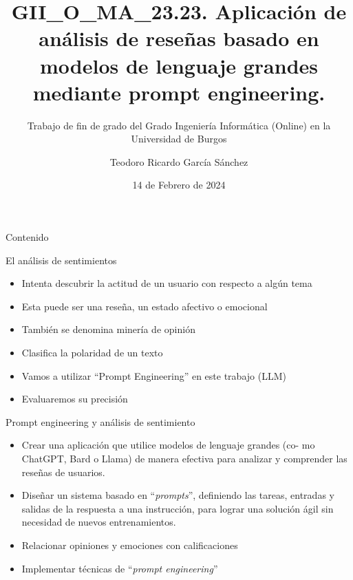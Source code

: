 \documentclass[aspectratio=169,xcolor=dvipsnames, t]{beamer}
\title[Prompt sentiment]{GII\_O\_MA\_23.23. Aplicación de análisis de reseñas basado en modelos de lenguaje grandes mediante prompt engineering.} %
\subtitle{Trabajo de fin de grado del Grado Ingeniería Informática (Online) en la Universidad de Burgos}
\author[García Sánchez]{Teodoro Ricardo García Sánchez}
\institute[Grado de Ingeniería Informática (Online)]{Dra. Virginia Ahedo García\\Dr. José Ignacio Santos Martín}
\date{14 de Febrero de 2024} %
\begin{document}
\maketitlepage

\begin{frame}[t]{Contenido}
    \tableofcontents
\end{frame}


\begin{frame}{El análisis de sentimientos}
    \begin{itemize}
        \item Intenta descubrir la actitud de un usuario con respecto a algún tema
        \item Esta puede ser una reseña, un estado afectivo o emocional
        \item También se denomina minería de opinión
        \item Clasifica la polaridad de un texto
        \item Vamos a utilizar ``Prompt Engineering'' en este trabajo (LLM)
        \item Evaluaremos su precisión
    \end{itemize}
\end{frame}


\begin{frame}{Prompt engineering y análisis de sentimiento}
    \begin{itemize}
        \item Crear una aplicación que utilice modelos de lenguaje grandes (co- mo ChatGPT, Bard o Llama) de manera efectiva para analizar y comprender las reseñas de usuarios.
        \item Diseñar un sistema basado en ``\emph{prompts}'', definiendo las tareas, entradas y salidas de la respuesta a una instrucción, para lograr una solución ágil sin necesidad de nuevos entrenamientos.
        \item Relacionar opiniones y emociones con calificaciones
        \item Implementar técnicas de ``\emph{prompt engineering}''
    \end{itemize}
\end{frame}
\end{document}
